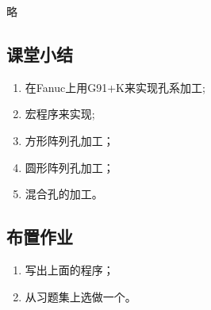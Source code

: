 略



\subsection{课堂小结}
\begin{enumerate}[1、]
	\item 在Fanuc上用G91+K来实现孔系加工;
	\item 宏程序来实现;
	\item 方形阵列孔加工；
	\item 圆形阵列孔加工；
	\item 混合孔的加工。
\end{enumerate}

\vfill
\subsection{布置作业}
\begin{enumerate}[1、]
	\item 写出上面的程序；
	\item 从习题集上选做一个。
\end{enumerate}
\vfill